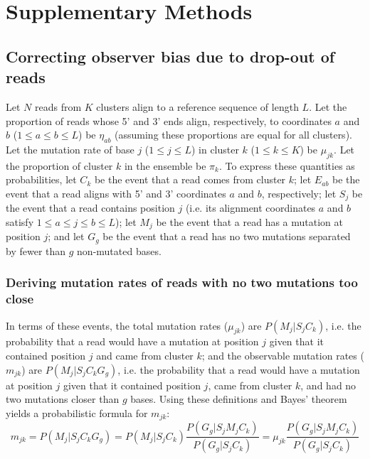 \documentclass[../../MainTexts/main.tex]{subfiles}
\begin{document}
\section*{Supplementary Methods}
\label{simethods}

\subsection{Correcting observer bias due to drop-out of reads}

Let $N$ reads from $K$ clusters align to a reference sequence of length $L$.
Let the proportion of reads whose 5' and 3' ends align, respectively, to coordinates $a$ and $b$ ($1 \le a \le b \le L$) be $\eta_{ab}$ (assuming these proportions are equal for all clusters). Let the mutation rate of base $j$ ($1 \le j \le L$) in cluster $k$ ($1 \le k \le K$) be $\mu_{jk}$.
Let the proportion of cluster $k$ in the ensemble be $\pi_k$.
To express these quantities as probabilities, let $C_k$ be the event that a read comes from cluster $k$; let $E_{ab}$ be the event that a read aligns with 5' and 3' coordinates $a$ and $b$, respectively; let $S_j$ be the event that a read contains position $j$ (i.e. its alignment coordinates $a$ and $b$ satisfy $1 \le a \le j \le b \le L$); let $M_j$ be the event that a read has a mutation at position $j$; and let $G_g$ be the event that a read has no two mutations separated by fewer than $g$ non-mutated bases.

\subsubsection{Deriving mutation rates of reads with no two mutations too close}
\label{calc_p_mut_noclose}

In terms of these events, the total mutation rates ($\mu_{jk}$) are $P(M_j | S_j C_k)$, i.e. the probability that a read would have a mutation at position $j$ given that it contained position $j$ and came from cluster $k$; and the observable mutation rates ($m_{jk}$) are $P(M_j | S_j C_k G_g)$, i.e. the probability that a read would have a mutation at position $j$ given that it contained position $j$, came from cluster $k$, and had no two mutations closer than $g$ bases.
Using these definitions and Bayes' theorem yields a probabilistic formula for $m_{jk}$:
$$m_{jk} = P(M_j | S_j C_k G_g) = P(M_j | S_j C_k) \frac{P(G_g | S_j M_j C_k)}{P(G_g | S_j C_k)} = \mu_{jk} \frac{P(G_g | S_j M_j C_k)}{P(G_g | S_j C_k)}$$
\end{document}
